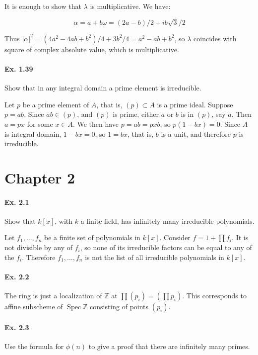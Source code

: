 \documentclass[notitlepage]{article}
\theoremstyle{definition}
\newcommand\Spec{\operatorname{Spec}}
\newcommand\Z{\mathbb{Z}}
\begin{document}
It is enough to show that $\lambda$ is multiplicative. We have:

\begin{equation}
  \alpha = a + b\omega = (2a-b)/2 + ib\sqrt{3}/2
\end{equation}

Thus $|\alpha|^2 = (4a^2 - 4ab +b^2)/4 + 3b^2/4 = a^2 - ab + b^2$, so
$\lambda$ coincides with square of complex absolute value, which is
multiplicative.

\paragraph{Ex. 1.39}
Show that in any integral domain a prime element is irreducible.

Let $p$ be a prime element of $A$, that is, $(p) \subset A$ is a prime
ideal. Suppose $p = ab$. Since $ab \in (p)$, and $(p)$ is prime,
either $a$ or $b$ is in $(p)$, say $a$. Then $a = px$ for some $x \in
A$. We then have $p = ab = pxb$, so $p(1-bx) = 0$. Since $A$ is
integral domain, $1-bx = 0$, so $1 = bx$, that is, $b$ is a unit, and
therefore $p$ is irreducible.

\section{Chapter 2}

\paragraph{Ex. 2.1}
Show that $k[x]$, with $k$ a finite field, has infinitely many
irreducible polynomials.

Let $f_1, \ldots, f_n$ be a finite set of polynomials in
$k[x]$. Consider $f = 1+ \prod f_i$. It is not divisible by any of
$f_i$, so none of its irreducible factors can be equal to any of the
$f_i$. Therefore $f_1, \ldots, f_n$ is not the list of all irreducible
polynomials in $k[x]$.

\paragraph{Ex. 2.2}

The ring is just a localization of $\Z$ at $\prod(p_i) = (\prod p_i)$. This
corresponds to affine subscheme of $\Spec \Z$ consisting of points
${(p_i)}$.

\paragraph{Ex. 2.3}
Use the formula for $\phi(n)$ to give a proof that there are infinitely many primes.
\end{document}
